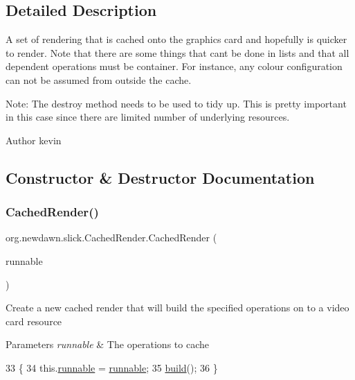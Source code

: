 \subsection{Detailed Description}
A set of rendering that is cached onto the graphics card and hopefully is quicker to render. Note that there are some things that can\textquotesingle{}t be done in lists and that all dependent operations must be container. For instance, any colour configuration can not be assumed from outside the cache.

Note\+: The destroy method needs to be used to tidy up. This is pretty important in this case since there are limited number of underlying resources.

\begin{DoxyAuthor}{Author}
kevin 
\end{DoxyAuthor}


\subsection{Constructor \& Destructor Documentation}
\mbox{\label{classorg_1_1newdawn_1_1slick_1_1_cached_render_ad3b6420296d51324138f0a14d354c7db}} 
\subsubsection{\texorpdfstring{Cached\+Render()}{CachedRender()}}
{\footnotesize\ttfamily org.\+newdawn.\+slick.\+Cached\+Render.\+Cached\+Render (\begin{DoxyParamCaption}\item[{Runnable}]{runnable }\end{DoxyParamCaption})\hspace{0.3cm}{\ttfamily [inline]}}

Create a new cached render that will build the specified operations on to a video card resource


\begin{DoxyParams}{Parameters}
{\em runnable} & The operations to cache \\
\hline
\end{DoxyParams}

\begin{DoxyCode}
33                                            \{
34         this.\mbox{\hyperlink{classorg_1_1newdawn_1_1slick_1_1_cached_render_adbb423a793a3b64353bf95ccdf9a99e9}{runnable}} = \mbox{\hyperlink{classorg_1_1newdawn_1_1slick_1_1_cached_render_adbb423a793a3b64353bf95ccdf9a99e9}{runnable}};
35         \mbox{\hyperlink{classorg_1_1newdawn_1_1slick_1_1_cached_render_a7631a43ef217b03800f81030b8636487}{build}}();
36     \}
\end{DoxyCode}


